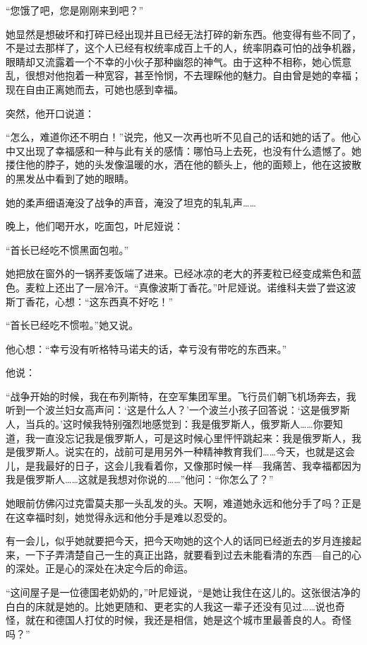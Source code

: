 “您饿了吧，您是刚刚来到吧？”

她显然是想破坏和打碎已经出现并且已经无法打碎的新东西。他变得有些不同了，不是过去那样了，这个人已经有权统率成百上千的人，统率阴森可怕的战争机器，眼睛却又流露着一个不幸的小伙子那种幽怨的神气。由于这种不相称，她心慌意乱，很想对他抱着一种宽容，甚至怜悯，不去理睬他的魅力。自由曾是她的幸福；现在自由正离她而去，可她也感到幸福。

突然，他开口说道：

“怎么，难道你还不明白！”说完，他又一次再也听不见自己的话和她的话了。他心中又出现了幸福感和一种与此有关的感情：哪怕马上去死，也没有什么遗憾了。她搂住他的脖子，她的头发像温暖的水，洒在他的额头上，他的面颊上，他在这披散的黑发丛中看到了她的眼睛。

她的柔声细语淹没了战争的声音，淹没了坦克的轧轧声……

晚上，他们喝开水，吃面包，叶尼娅说：

“首长已经吃不惯黑面包啦。”

她把放在窗外的一锅荞麦饭端了进来。已经冰凉的老大的荞麦粒已经变成紫色和蓝色。麦粒上还出了一层冷汗。“真像波斯丁香花。”叶尼娅说。诺维科夫尝了尝这波斯丁香花，心想：“这东西真不好吃！”

“首长已经吃不惯啦。”她又说。

他心想：“幸亏没有听格特马诺夫的话，幸亏没有带吃的东西来。”

他说：

“战争开始的时候，我在布列斯特，在空军集团军里。飞行员们朝飞机场奔去，我听到一个波兰妇女高声问：‘这是什么人？’一个波兰小孩子回答说：‘这是俄罗斯人，当兵的。’这时候我特别强烈地感觉到：我是俄罗斯人，俄罗斯人……你要知道，我一直没忘记我是俄罗斯人，可是这时候心里怦怦跳起来：我是俄罗斯人，我是俄罗斯人。说实在的，战前可是用另外一种精神教育我们……今天，也就是这会儿，是我最好的日子，这会儿我看着你，又像那时候一样—我痛苦、我幸福都因为我是俄罗斯人……这就是我想对你说的……”他问：“你怎么了？”

她眼前仿佛闪过克雷莫夫那一头乱发的头。天啊，难道她永远和他分手了吗？正是在这幸福时刻，她觉得永远和他分手是难以忍受的。

有一会儿，似乎她就要把今天，把今天吻她的这个人的话同已经逝去的岁月连接起来，一下子弄清楚自己一生的真正出路，就要看到过去未能看清的东西—自己的心的深处。正是心的深处在决定今后的命运。

“这间屋子是一位德国老奶奶的，”叶尼娅说，“是她让我住在这儿的。这张很洁净的白白的床就是她的。比她更随和、更老实的人我这一辈子还没有见过……说也奇怪，就在和德国人打仗的时候，我还是相信，她是这个城市里最善良的人。奇怪吗？”

